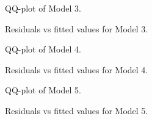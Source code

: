 \documentclass[10pt,letterpaper]{article}
\begin{document}
\begin{figure}[htb]
  \caption{QQ-plot of Model 3.}
\end{figure}

\begin{figure}[htb]
  \caption{Residuals vs fitted values for Model 3.}
\end{figure}

\begin{figure}[htb]
  \caption{QQ-plot of Model 4.}
\end{figure}

\begin{figure}[htb]
  \caption{Residuals vs fitted values for Model 4.}
\end{figure}
\begin{figure}[htb]
  \caption{QQ-plot of Model 5.}
\end{figure}

\begin{figure}[htb]
  \caption{Residuals vs fitted values for Model 5.}
\end{figure}






\end{document}
